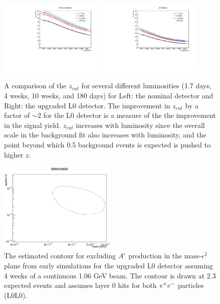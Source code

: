 \begin{figure}
    \centering
    \includegraphics[width=0.45\textwidth]{figs/upgrades/zcut_nominal.pdf}
    \includegraphics[width=0.45\textwidth]{figs/upgrades/zcut_L0.pdf}
    \caption{A comparison of the $z_{cut}$ for several different luminosities (1.7 days, 4 weeks, 10 weeks, and 180 days) for Left: the nominal detector and Right: the upgraded L0 detector. The improvement in $z_{cut}$ by a factor of $\sim 2$ for the L0 detector is a measure of the the improvement in the signal yield. $z_{cut}$ increases with luminosity since the overall scale in the background fit also increases with luminosity, and the point beyond which 0.5 background events is expected is pushed to higher $z$.}
    \label{fig:L0zcut}
\end{figure}

\begin{figure}
    \centering
    \includegraphics[width=0.5\textwidth]{figs/upgrades/L0_4weeks_detectable.png}
    \caption{The estimated contour for excluding $A^\prime$ production in the mass-$\epsilon^2$ plane from early simulations for the upgraded L0 detector assuming 4 weeks of a continuous 1.06 GeV beam. The contour is drawn at 2.3 expected events and assumes layer 0 hits for both $e^{+}e^{-}$ particles (L0L0).}
    \label{fig:L0projections}
\end{figure}

